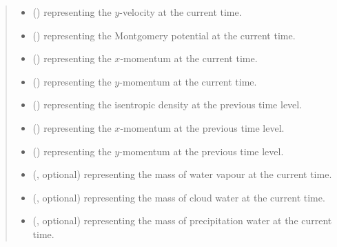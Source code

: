 \documentclass[letterpaper,10pt,english]{sphinxmanual}
\begin{document}
\begin{fulllineitems}
\begin{fulllineitems}
\begin{quote}
\begin{description}
\begin{itemize}
\item {} 
 () \textendash{}  representing the \(y\)-velocity at the current time.

\item {} 
 () \textendash{}  representing the Montgomery potential at the current time.

\item {} 
 () \textendash{}  representing the \(x\)-momentum at the current time.

\item {} 
 () \textendash{}  representing the \(y\)-momentum at the current time.

\item {} 
 () \textendash{}  representing the isentropic density at the previous time level.

\item {} 
 () \textendash{}  representing the \(x\)-momentum at the previous time level.

\item {} 
 () \textendash{}  representing the \(y\)-momentum at the previous time level.

\item {} 
 (, optional) \textendash{}  representing the mass of water vapour at the current time.

\item {} 
 (, optional) \textendash{}  representing the mass of cloud water at the current time.

\item {} 
 (, optional) \textendash{}  representing the mass of precipitation water at the current time.


\end{itemize}
\end{description}
\end{quote}
\end{fulllineitems}
\end{fulllineitems}
\end{document}
